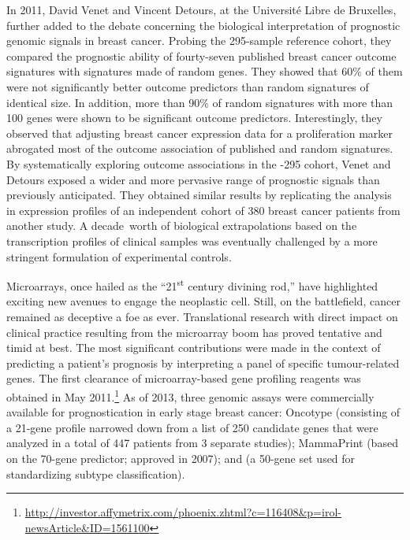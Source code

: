 
In 2011, David Venet and Vincent Detours, at the Université Libre de Bruxelles,
further added to the debate concerning the biological interpretation of
prognostic genomic signals in breast cancer.\cite{venet_most_2011} Probing the
\mbox{295-sample}  reference cohort, they compared the prognostic
ability of \mbox{fourty-seven} published breast cancer outcome signatures with
signatures made of random genes.  They showed that 60\% of them were not
significantly better outcome predictors than random signatures of identical
size.  In addition, more than 90\% of random signatures with more than 100 genes
were shown to be significant outcome predictors.  Interestingly, they observed
that adjusting breast cancer expression data for a proliferation marker
abrogated most of the outcome association of published and random signatures.
By systematically exploring outcome associations in the -295
cohort, Venet and Detours exposed a wider and more pervasive range of prognostic
signals than previously anticipated.  They obtained similar results by
replicating the analysis in expression profiles of an independent cohort of 380
breast cancer patients from another study.\cite{loi_definition_2007} A
\mbox{decade worth} of biological extrapolations based on the transcription
profiles of clinical samples was eventually challenged by a more stringent
formulation of experimental controls.

\medskip

Microarrays, once hailed as the ``21\textsuperscript{st} century divining
rod,''\cite{he_microarrays21st_2001} have highlighted exciting new avenues to
engage the neoplastic cell.  Still, on the battlefield, cancer remained as
deceptive a foe as ever.  Translational research with direct impact on clinical
practice resulting from the microarray boom has proved tentative and timid at
best.  The most significant contributions were made in the context of predicting
a patient's prognosis by interpreting a panel of specific \mbox{tumour-related}
genes.  The first  clearance of \mbox{microarray-based} gene
profiling reagents was obtained in May
2011.\footnote{\url{http://investor.affymetrix.com/phoenix.zhtml?c=116408&p=irol-newsArticle&ID=1561100}}
As of 2013,\cite{kittaneh_molecular_2013} three genomic assays were commercially
available for prognostication in early stage breast cancer: Oncotype
 (consisting of a \mbox{21-gene} profile narrowed down from a list
of 250 candidate genes that were analyzed in a total of 447 patients from 3
separate studies); MammaPrint (based on the \mbox{70-gene} 
predictor;  approved in 2007); and  (a
\mbox{50-gene} set used for standardizing subtype classification).

